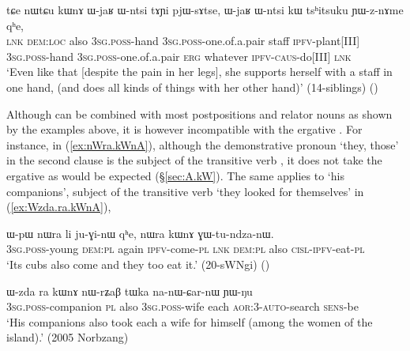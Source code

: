     \begin{exe}
\ex \label{ex:nWtCu.kWnA2}
\gll    tɕe nɯtɕu kɯnɤ ɯ-jaʁ ɯ-ntsi tɤɲi pjɯ-sɤtse, ɯ-jaʁ ɯ-ntsi kɯ tsʰitsuku ɲɯ-z-nɤme qʰe, \\
\textsc{lnk} \textsc{dem}:\textsc{loc} also \textsc{3sg}.\textsc{poss}-hand \textsc{3sg}.\textsc{poss}-one.of.a.pair staff \textsc{ipfv}-plant[III]  \textsc{3sg}.\textsc{poss}-hand \textsc{3sg}.\textsc{poss}-one.of.a.pair \textsc{erg} whatever \textsc{ipfv}-\textsc{caus}-do[III] \textsc{lnk}  \\
\glt `Even like that [despite the pain in her legs], she supports herself with a staff in one hand, (and does all kinds of things with her other hand)' (14-siblings) ()
\end{exe}

Although  can be combined with most postpositions and relator nouns as shown by the examples above, it is however incompatible with the ergative . For instance, in  (\ref{ex:nWra.kWnA}), although the demonstrative pronoun  `they, those' in the second clause is the subject of the transitive verb , it does not take the ergative  as would be expected (§\ref{sec:A.kW}). The same applies to  `his companions', subject of the transitive verb  `they looked for themselves' in (\ref{ex:Wzda.ra.kWnA}), 

  \begin{exe}
\ex \label{ex:nWra.kWnA}
\gll ɯ-pɯ nɯra li ju-ɣi-nɯ qʰe, nɯra kɯnɤ ɣɯ-tu-ndza-nɯ. \\
\textsc{3sg}.\textsc{poss}-young \textsc{dem}:\textsc{pl} again \textsc{ipfv}-come-\textsc{pl} \textsc{lnk} \textsc{dem}:\textsc{pl} also \textsc{cisl}-\textsc{ipfv}-eat-\textsc{pl} \\
\glt `Its cubs also come and they too eat it.' (20-sWNgi) ()
\end{exe}
  
\begin{exe}
\ex \label{ex:Wzda.ra.kWnA}
\gll   ɯ-zda ra kɯnɤ nɯ-rʑaβ tɯka na-nɯ-ɕar-nɯ ɲɯ-ŋu \\
\textsc{3sg}.\textsc{poss}-companion \textsc{pl} also \textsc{3sg}.\textsc{poss}-wife each \textsc{aor}:3\flobv{}-\textsc{auto}-search \textsc{sens}-be \\
\glt `His companions also took each a wife for himself (among the women of the island).' (2005 Norbzang)
    \end{exe}
    
